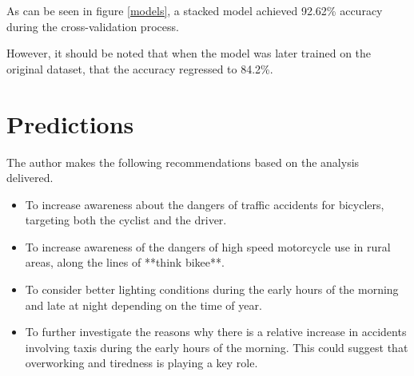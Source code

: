 \documentclass[12pt]{article}
\begin{document}
As can be seen in figure \ref{models}, a stacked model achieved 92.62\% accuracy during the cross-validation process. 

However, it should be noted that when the model was later trained on the original dataset, that the accuracy regressed to 84.2\%.

\section{Predictions}

The author makes the following recommendations based on the analysis delivered.
\begin{itemize}
\item To increase awareness about the dangers of traffic accidents for bicyclers, targeting both the cyclist and the driver.
\item To increase awareness of the dangers of high speed motorcycle use in rural areas, along the lines of **think bikee**. 
\item To consider better lighting conditions during the early hours of the morning and late at night depending on the time of year.
\item To further investigate the reasons why there is a relative increase in accidents involving taxis during the early hours of the morning. This could suggest that overworking and tiredness is playing a key role.
\end{itemize}

\printbibliography
\end{document}
